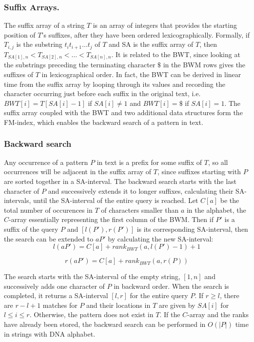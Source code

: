 \documentclass[runningheads,a4paper]{llncs}
\begin{document}
\subsubsection{Suffix Arrays.} The suffix array of a string $T$ is an array of integers that provides the starting position of $T$'s suffixes, after they have been ordered lexicographically. Formally, if $T_{i,j}$ is the substring $t_i t_{i+1} \ldots t_j$ of $T$ and SA is the suffix array of $T$, then $T_{SA[1],n}<T_{SA[2],n}<\ldots <T_{SA[n],n}$. It is related to the BWT, since looking at the substrings preceding the terminating character $\$$ in the BWM rows gives the suffixes of $T$ in lexicographical order. In fact, the BWT can be derived in linear time from the suffix array by looping through its values and recording the character occurring just before each suffix in the original text, i.e. $BWT[i]=T[SA[i]-1]$ if $SA[i]\neq1$ and $BWT[i]=\$$ if $SA[i]=1$. The suffix array coupled with the BWT and two additional data structures form the FM-index, which enables the backward search of a pattern in text.

\subsubsection{Backward search}
Any occurrence of a pattern $P$ in text is a prefix for some suffix of $T$, so all occurrences will be adjacent in the suffix array of $T$, since suffixes starting with $P$ are sorted together in a SA-interval. The backward search starts with the last character of $P$ and successively extends it to longer suffixes, calculating their SA-intervals, until the SA-interval of the entire query is reached. Let $C[a]$ be the total number of occurences in $T$ of characters smaller than $a$ in the alphabet, the $C$-array essentially representing the first column of the BWM. Then if $P'$ is a suffix of the query $P$ and $[l(P'),r(P')]$ is its corresponding SA-interval, then the search can be extended to $aP'$ by calculating the new SA-interval:
\newline
\begin{equation} 
l(aP')=C[a]+rank_{BWT}(a,l(P')-1)+1 
\end{equation} 

\begin{equation} 
r(aP')=C[a]+rank_{BWT}(a,r(P))
\end{equation}

The search starts with the SA-interval of the empty string, $[1,n]$ and successively adds one character of $P$ in backward order. When the search is completed, it returns a SA-interval $[l,r]$ for the entire query $P$. If $r \geq l$, there are $r-l+1$ matches for $P$ and their locations in $T$ are given by $SA[i]$ for $l \leq i \leq r$. Otherwise, the pattern does not exist in $T$. If the $C$-array and the ranks have already been stored, the backward search can be performed in $O(|P|)$ time in strings with DNA alphabet.
\end{document}
